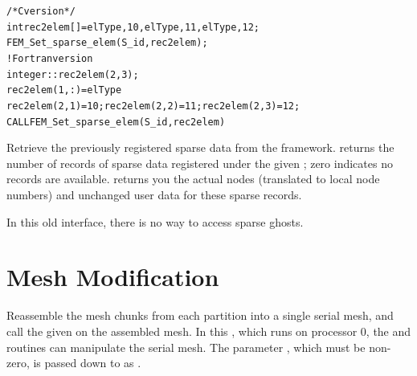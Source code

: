 \begin{alltt}
/*C version*/
  int rec2elem[]={elType,10, elType,11, elType,12};
  FEM\_Set\_sparse\_elem(S\_id,rec2elem);
! Fortran version
  integer :: rec2elem(2,3);
  rec2elem(1,:)=elType
  rec2elem(2,1)=10; rec2elem(2,2)=11; rec2elem(2,3)=12;
  CALL FEM\_Set\_sparse\_elem(S\_id,rec2elem)
\end{alltt}



Retrieve the previously registered sparse data from the framework.
 returns the number of records of sparse
data registered under the given ; zero indicates no records
are available.   returns you the actual nodes
(translated to local node numbers) and unchanged user data for
these sparse records.

In this old interface, there is no way to access sparse ghosts.



\newpage
\section{Mesh Modification}



Reassemble the mesh chunks from each partition into a single serial mesh,
and call the given  on the assembled mesh.
In this , which runs on processor 0, the  and  routines
can manipulate the serial mesh.  The parameter , which must
be non-zero, is passed down to  as .

